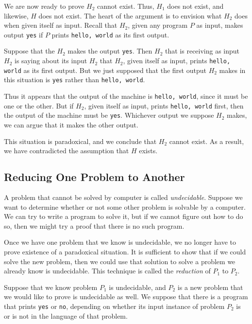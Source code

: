 \documentclass[]{article}
\begin{document}
We are now ready to prove $H_2$ cannot exist. Thus, $H_1$ does not exist,
and likewise, $H$ does not exist. The heart of the argument is to envision
what $H_2$ does when given itself as input. Recall that $H_2$, given any
program $P$ as input, makes output \texttt{yes} if $P$ prints
\texttt{hello, world} as its first output.

Suppose that the $H_2$ makes the output \texttt{yes}. Then $H_2$ that is
receiving as input $H_2$ is saying about its input $H_2$ that $H_2$, given
itself as input, prints \texttt{hello, world} as its first output. But we
just supposed that the first output $H_2$ makes in this situation is
\texttt{yes} rather than \texttt{hello, world}.

Thus it appears that the output of the machine is \texttt{hello, world},
since it must be one or the other. But if $H_2$, given itself as input,
prints \texttt{hello, world} first, then the output of the machine must be
\texttt{yes}. Whichever output we suppose $H_2$ makes, we can argue that it
makes the other output.

This situation is paradoxical, and we conclude that $H_2$ cannot exist. As
a result, we have contradicted the assumption that $H$ exists.

\subsection*{Reducing One Problem to Another}
A problem that cannot be solved by computer is called \emph{undecidable}.
Suppose we want to determine whether or not some other problem is solvable
by a computer. We can try to write a program to solve it, but if we cannot
figure out how to do so, then we might try a proof that there is no such
program.

Once we have one problem that we know is undecidable, we no longer have to
prove existence of a paradoxical situation. It is sufficient to show that
if we could solve the new problem, then we could use that solution to solve
a problem we already know is undecidable. This technique is called the
\emph{reduction} of $P_1$ to $P_2$.

Suppose that we know problem $P_1$ is undecidable, and $P_2$ is a new
problem that we would like to prove is undecidable as well. We suppose that
there is a program that prints \texttt{yes} or \texttt{no}, depending on
whether its input instance of problem $P_2$ is or is not in the language of
that problem.
\end{document}
